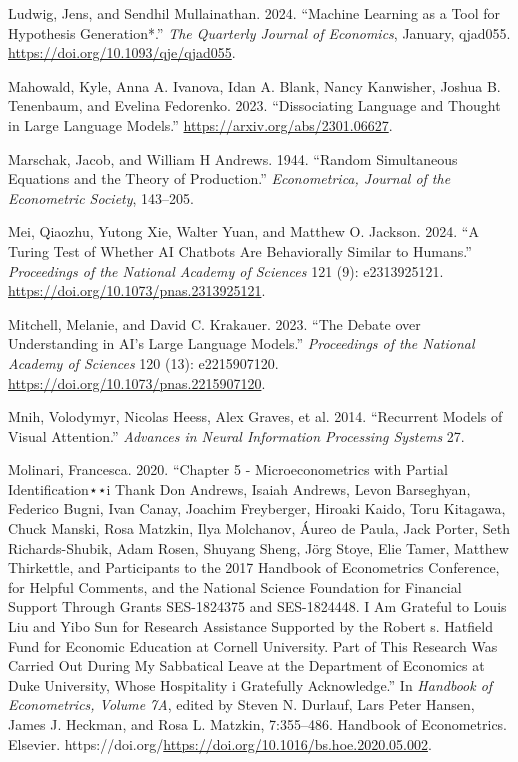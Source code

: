 \documentclass[
]{article}
\newlength{\cslhangindent}
\newenvironment{CSLReferences}[2] %
 {\begin{list}{}{%
  \setlength{\itemindent}{0pt}
  \setlength{\leftmargin}{0pt}
  \setlength{\parsep}{0pt}
  \ifodd #1
   \setlength{\leftmargin}{\cslhangindent}
   \setlength{\itemindent}{-1\cslhangindent}
  \fi
  \setlength{\itemsep}{#2\baselineskip}}}
 {\end{list}}
\begin{document}
\begin{CSLReferences}{1}{0}
Ludwig, Jens, and Sendhil Mullainathan. 2024. {``{Machine Learning as a
Tool for Hypothesis Generation*}.''} \emph{The Quarterly Journal of
Economics}, January, qjad055. \url{https://doi.org/10.1093/qje/qjad055}.

Mahowald, Kyle, Anna A. Ivanova, Idan A. Blank, Nancy Kanwisher, Joshua
B. Tenenbaum, and Evelina Fedorenko. 2023. {``Dissociating Language and
Thought in Large Language Models.''}
\url{https://arxiv.org/abs/2301.06627}.

Marschak, Jacob, and William H Andrews. 1944. {``Random Simultaneous
Equations and the Theory of Production.''} \emph{Econometrica, Journal
of the Econometric Society}, 143--205.

Mei, Qiaozhu, Yutong Xie, Walter Yuan, and Matthew O. Jackson. 2024.
{``A Turing Test of Whether AI Chatbots Are Behaviorally Similar to
Humans.''} \emph{Proceedings of the National Academy of Sciences} 121
(9): e2313925121. \url{https://doi.org/10.1073/pnas.2313925121}.

Mitchell, Melanie, and David C. Krakauer. 2023. {``The Debate over
Understanding in AI's Large Language Models.''} \emph{Proceedings of the
National Academy of Sciences} 120 (13): e2215907120.
\url{https://doi.org/10.1073/pnas.2215907120}.

Mnih, Volodymyr, Nicolas Heess, Alex Graves, et al. 2014. {``Recurrent
Models of Visual Attention.''} \emph{Advances in Neural Information
Processing Systems} 27.

Molinari, Francesca. 2020. {``Chapter 5 - Microeconometrics with Partial
Identification⋆⋆i Thank Don Andrews, Isaiah Andrews, Levon Barseghyan,
Federico Bugni, Ivan Canay, Joachim Freyberger, Hiroaki Kaido, Toru
Kitagawa, Chuck Manski, Rosa Matzkin, Ilya Molchanov, Áureo de Paula,
Jack Porter, Seth Richards-Shubik, Adam Rosen, Shuyang Sheng, Jörg
Stoye, Elie Tamer, Matthew Thirkettle, and Participants to the 2017
Handbook of Econometrics Conference, for Helpful Comments, and the
National Science Foundation for Financial Support Through Grants
SES-1824375 and SES-1824448. I Am Grateful to Louis Liu and Yibo Sun for
Research Assistance Supported by the Robert s. Hatfield Fund for
Economic Education at Cornell University. Part of This Research Was
Carried Out During My Sabbatical Leave at the Department of Economics at
Duke University, Whose Hospitality i Gratefully Acknowledge.''} In
\emph{Handbook of Econometrics, Volume 7A}, edited by Steven N. Durlauf,
Lars Peter Hansen, James J. Heckman, and Rosa L. Matzkin, 7:355--486.
Handbook of Econometrics. Elsevier.
https://doi.org/\url{https://doi.org/10.1016/bs.hoe.2020.05.002}.


\end{CSLReferences}
\end{document}
